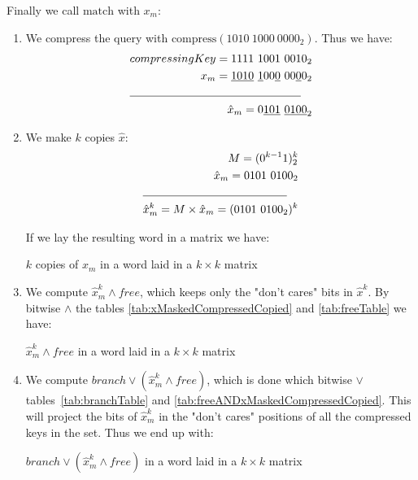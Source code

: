 \begin{enumerate}
    Finally we call $\text{match}$ with $x_m$:
    \begin{enumerate}
        \item
        We compress the query with $\text{compress}(1010\ 1000\ 0000_2)$. Thus we have:
        \begin{align*}
            compressingKey = 1111\ 1001\ 0010_2\\
            x_m = \underline{1010}\ \underline{1}00\underline{0}\ 00\underline{0}0_2\\
            \cline{1-2}
            \hat x_m = 0\underline{101}\ \underline{0100}_2
        \end{align*}
        \item
        We make $k$ copies $\hat x$:
        \begin{align*}
            M = (0^{k-1}1)^k_2\\
            \hat x_m = 0101\ 0100_2\\
            \cline{1-2}
            \hat x^k_m = M \times \hat x_m = (0101\ 0100_2)^k\\
        \end{align*}
        
        If we lay the resulting word in a matrix we have:
        \begin{table}[H]
        \centering
        
        \caption[Example of $k$ copies of $\hat x_m$ in a word laid in a $k \times k$ matrix]{$k$ copies of $\hat x_m$ in a word laid in a $k \times k$ matrix}
        \label{tab:xMaskedCompressedCopied}
        \end{table}
        
        \item
        
        We compute $\hat x^k_m \wedge free$, which keeps only the "don't cares" bits in $\hat x^k$. By bitwise $\wedge$ the tables \ref{tab:xMaskedCompressedCopied} and \ref{tab:freeTable} we have:
        \begin{table}[H]
        \centering
        
        \caption[Example of $\hat x^k_m \wedge free$ in a word laid in a $k \times k$ matrix]{$\hat x^k_m \wedge free$ in a word laid in a $k \times k$ matrix}
        \label{tab:freeANDxMaskedCompressedCopied}
        \end{table}
        
        \item
        We compute $branch \vee (\hat x^k_m \wedge free)$, which is done which bitwise $\vee$ tables~\ref{tab:branchTable} and \ref{tab:freeANDxMaskedCompressedCopied}. This will project the bits of $\hat x^k_m$ in the "don't cares" positions of all the compressed keys in the set. Thus we end up with:
        \begin{table}[H]
        \centering
        
        \caption[Example of $branch \vee (\hat x^k_m \wedge free)$ in a word laid in a $k \times k$ matrix]{$branch \vee (\hat x^k_m \wedge free)$ in a word laid in a $k \times k$ matrix}
        \label{tab:branchORfreeANDxMCopied}
        \end{table}
        

\end{enumerate}
\end{enumerate}
